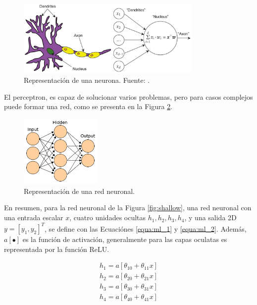 
\begin{figure}[H]
	\centering
	\includegraphics[width=0.8\textwidth]{../img/neoantigen/neuron}
	\caption{Representación de una neurona. Fuente: \cite{insideDL2022}.}
	\label{fig:neuron}
\end{figure}

El perceptron, es capaz de solucionar varios problemas, pero para casos complejos puede formar una red, como se presenta en la Figura \ref{fig:nn}.

\begin{figure}[H]
	\centering
	\includegraphics[width=0.35\textwidth]{../img/neoantigen/nn2}
	\caption{Representación de una red neuronal. }
	\label{fig:nn}
\end{figure}

En resumen, para la red neuronal de la Figura \ref{fig:shallow}, una red neuronal con una entrada escalar $x$, cuatro unidades ocultas $h_1, h_2, h_3, h_4$, y una salida 2D $y = [y_1, y_2]^T$, se define con las Ecuaciónes \ref{equa:ml_1} y \ref{equa:ml_2}. Además, $a[\bullet]$ es la función de activación, generalmente para las capas oculatas es representada por la función ReLU.

\begin{equation}\label{equa:ml_1}
	\begin{split}
	h_1 = a [ \theta_{10} + \theta_{11}x  ]	 \\	
	h_2 = a [ \theta_{20} + \theta_{21}x  ]	 \\
	h_3 = a [ \theta_{30} + \theta_{31}x  ]	 \\
	h_4 = a [ \theta_{40} + \theta_{41}x  ]	 
	\end{split}
\end{equation}	


